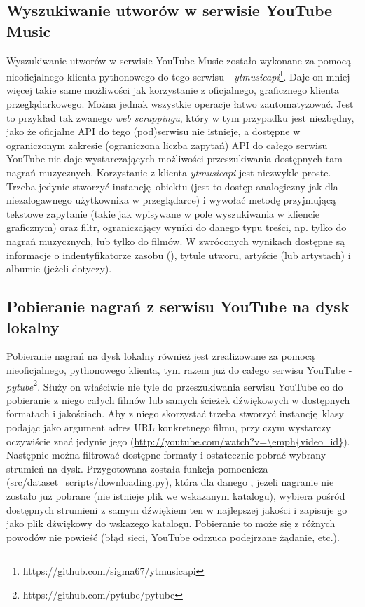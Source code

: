 \subsection{Wyszukiwanie utworów w serwisie YouTube Music}
Wyszukiwanie utworów w serwisie YouTube Music zostało wykonane za pomocą nieoficjalnego klienta
pythonowego do tego serwisu - \emph{ytmusicapi}\footnote{https://github.com/sigma67/ytmusicapi}.
Daje on mniej więcej takie same możliwości jak korzystanie z oficjalnego, graficznego klienta
przeglądarkowego. Można jednak wszystkie operacje łatwo zautomatyzować. Jest to przykład tak zwanego
\emph{web scrappingu}, który w tym przypadku jest niezbędny, jako że oficjalne API do tego (pod)serwisu
nie istnieje, a dostępne w ograniczonym zakresie (ograniczona liczba zapytań) API do całego serwisu
YouTube nie daje wystarczających możliwości przeszukiwania dostępnych tam nagrań muzycznych.
Korzystanie z klienta \emph{ytmusicapi} jest niezwykle proste. Trzeba jedynie stworzyć
instancję obiektu  (jest to dostęp analogiczny jak dla niezalogawnego użytkownika w
przeglądarce) i wywołać metodę  przyjmującą tekstowe zapytanie (takie jak wpisywane w
pole wyszukiwania w kliencie graficznym) oraz filtr, ograniczający wyniki do danego typu treści, np.
tylko do nagrań muzycznych, lub tylko do filmów. W zwróconych wynikach dostępne są informacje o
indentyfikatorze zasobu (), tytule utworu, artyście (lub artystach) i albumie
(jeżeli dotyczy).

\subsection{Pobieranie nagrań z serwisu YouTube na dysk lokalny}
Pobieranie nagrań na dysk lokalny również jest zrealizowane za pomocą nieoficjalnego, pythonowego
klienta, tym razem już do całego serwisu YouTube -
\emph{pytube}\footnote{https://github.com/pytube/pytube}. Służy on właściwie nie tyle do
przeszukiwania serwisu YouTube co do pobieranie z niego całych filmów lub samych ścieżek dźwiękowych
w dostępnych formatach i jakościach. Aby z niego skorzystać trzeba stworzyć instancję klasy
 podając jako argument adres URL konkretnego filmu, przy czym wystarczy oczywiście
znać jedynie jego  (\url{http://youtube.com/watch?v=\emph{video\_id}}). Następnie
można filtrować dostępne formaty i ostatecznie pobrać wybrany strumień na dysk. Przygotowana została
funkcja pomocnicza (\url{src/dataset\_scripts/downloading.py}), która dla danego ,
jeżeli nagranie nie zostało już pobrane (nie istnieje plik we wskazanym katalogu), wybiera pośród
dostępnych strumieni z samym dźwiękiem ten w najlepszej jakości i zapisuje go jako plik dźwiękowy do
wskazego katalogu. Pobieranie to może się z różnych powodów nie powieść (błąd sieci, YouTube odrzuca
podejrzane żądanie, etc.).

